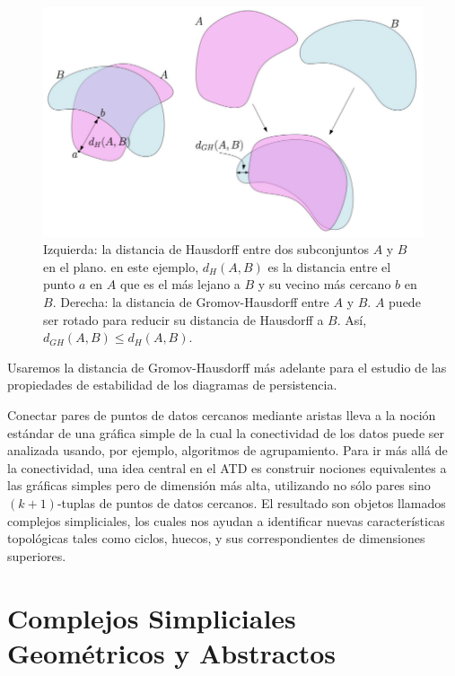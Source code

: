 \begin{figure}[h]
    \centering
    \includegraphics[width=0.85\linewidth]{./figures/Figura1_c1.png}
    \caption{
        Izquierda: la distancia de Hausdorff entre dos subconjuntos $A$ y $B$ en el plano. en este ejemplo,
        $d_{H}\left(A, B\right)$ es la distancia entre el punto $a$ en $A$ que es el m\'as lejano a $B$ y
        su vecino m\'as cercano $b$ en $B$. Derecha: la distancia de Gromov-Hausdorff entre $A$ y $B$. $A$
        puede ser rotado para reducir su distancia de Hausdorff a $B$. As\'i, $d_{GH}\left(A, B\right) \leq
        d_{H}\left(A, B\right)$.
    }
    \label{fig:Figura 1}
    \vspace{15pt}
\end{figure}

Usaremos la distancia de Gromov-Hausdorff m\'as adelante para el estudio de las propiedades de estabilidad
de los diagramas de persistencia.

Conectar pares de puntos de datos cercanos mediante aristas lleva a la noci\'on est\'andar de una gr\'afica
simple de la cual la conectividad de los datos puede ser analizada usando, por ejemplo, algoritmos de
agrupamiento. Para ir m\'as all\'a de la conectividad, una idea central en el ATD es construir nociones
equivalentes a las gr\'aficas simples pero de dimensi\'on m\'as alta, utilizando no s\'olo pares sino
$\left(k + 1\right)$-tuplas de puntos de datos cercanos. El resultado son objetos llamados complejos
simpliciales, los cuales nos ayudan a identificar nuevas caracter\'isticas topol\'ogicas tales como ciclos,
huecos, y sus correspondientes de dimensiones superiores.

\section*{Complejos Simpliciales Geom\'etricos y Abstractos}

